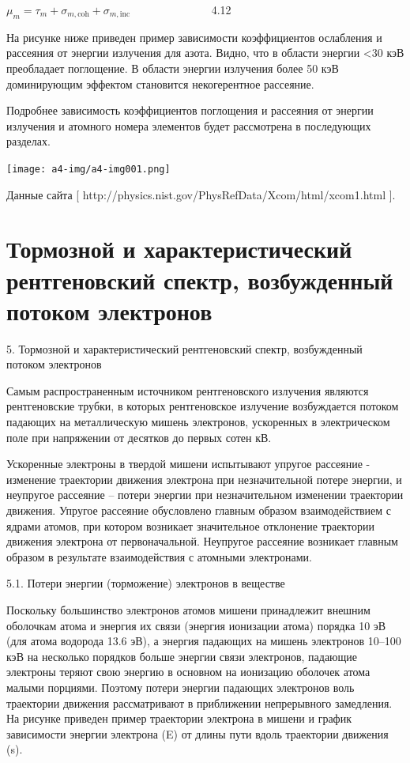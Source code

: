 \documentclass[a4paper,14pt, openany, twoside, draft]{extbook} %
\begin{document}
 $\mu _m=\tau _m+\sigma _{m,\text{coh}}+\sigma _{m,\text{inc}}$ \ \ \ \ \ \ \ \ \ \ \ \ \ \ 4.12

На рисунке ниже приведен пример зависимости коэффициентов ослабления и рассеяния от энергии излучения для азота. Видно, что в области энергии {\textless}30 кэВ преобладает поглощение. В области энергии излучения более 50 кэВ доминирующим эффектом становится некогерентное рассеяние.

Подробнее зависимость коэффициентов поглощения и рассеяния от энергии излучения и атомного номера элементов будет рассмотрена в последующих разделах.

 \texttt{[image: a4-img/a4-img001.png]}

Данные сайта [ http://physics.nist.gov/PhysRefData/Xcom/html/xcom1.html ].
\chapter{Тормозной и характеристический рентгеновский спектр, возбужденный потоком электронов}
\label{cha:torm-spec}
5. Тормозной и характеристический рентгеновский спектр, возбужденный потоком электронов

Самым распространенным источником рентгеновского излучения являются рентгеновские трубки, в которых рентгеновское излучение возбуждается потоком падающих на металлическую мишень электронов, ускоренных в электрическом поле при напряжении от десятков до первых сотен кВ.

Ускоренные электроны в твердой мишени испытывают упругое рассеяние - изменение траектории движения электрона при незначительной потере энергии, и неупругое рассеяние – потери энергии при незначительном изменении траектории движения. Упругое рассеяние обусловлено главным образом взаимодействием с ядрами атомов, при котором возникает значительное отклонение траектории движения электрона от первоначальной. Неупругое рассеяние возникает главным образом в результате взаимодействия с атомными электронами.

5.1. Потери энергии (торможение) электронов в веществе

Поскольку большинство электронов атомов мишени принадлежит внешним оболочкам атома и энергия их связи (энергия ионизации атома) порядка 10 эВ (для атома водорода 13.6 эВ), а энергия падающих на мишень электронов 10–100 кэВ на несколько порядков больше энергии связи электронов, падающие электроны теряют свою энергию в основном на ионизацию оболочек атома малыми порциями. Поэтому потери энергии падающих электронов воль траектории движения рассматривают в приближении непрерывного замедления. На рисунке приведен пример траектории электрона в мишени и график зависимости энергии электрона (E) от длины пути вдоль траектории движения (s).
\end{document}
